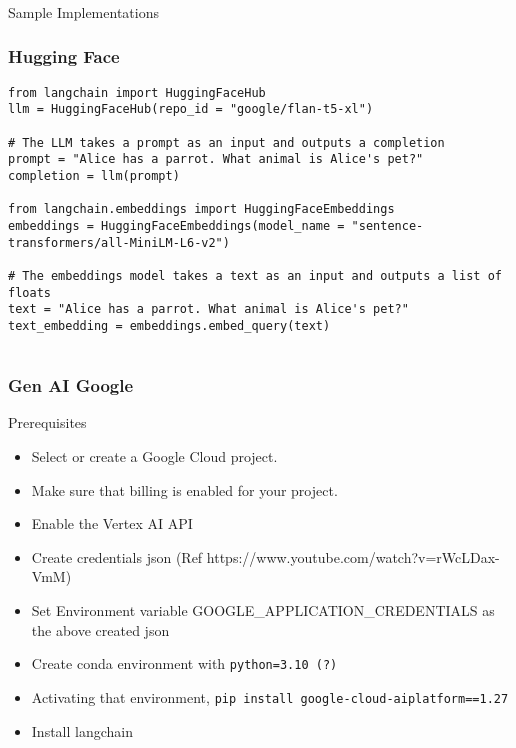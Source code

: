\begin{frame}[fragile]\frametitle{}
\begin{center}
{\Large Sample Implementations}
\end{center}
\end{frame}

\begin{frame}[fragile]\frametitle{Hugging Face}

\begin{lstlisting}
from langchain import HuggingFaceHub
llm = HuggingFaceHub(repo_id = "google/flan-t5-xl")

# The LLM takes a prompt as an input and outputs a completion
prompt = "Alice has a parrot. What animal is Alice's pet?"
completion = llm(prompt)

from langchain.embeddings import HuggingFaceEmbeddings
embeddings = HuggingFaceEmbeddings(model_name = "sentence-transformers/all-MiniLM-L6-v2")

# The embeddings model takes a text as an input and outputs a list of floats
text = "Alice has a parrot. What animal is Alice's pet?"
text_embedding = embeddings.embed_query(text)


\end{lstlisting}


\end{frame}

\begin{frame}[fragile]\frametitle{Gen AI Google}

Prerequisites
\begin{itemize}
\item Select or create a Google Cloud project.
\item Make sure that billing is enabled for your project.
\item Enable the Vertex AI API
\item Create credentials json (Ref https://www.youtube.com/watch?v=rWcLDax-VmM)
\item Set Environment variable GOOGLE\_APPLICATION\_CREDENTIALS as the above created json
\item Create conda environment with \lstinline|python=3.10 (?)|
\item Activating that environment, \lstinline|pip install google-cloud-aiplatform==1.27|
\item Install langchain
\end{itemize}


\end{frame}


